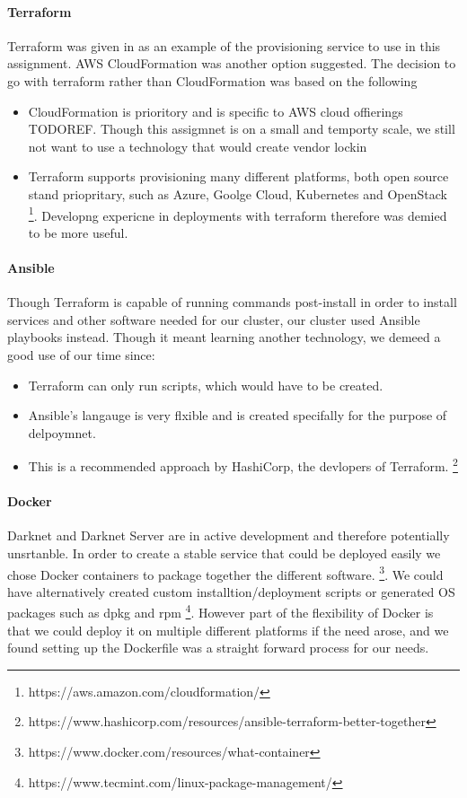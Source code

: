 \documentclass[conference]{IEEEtran}
\begin{document}
\paragraph{Terraform}
Terraform was given in as an example of the provisioning service to use in this assignment. AWS CloudFormation was another option suggested. The decision to go with terraform rather than CloudFormation was based on the following
\begin{itemize}
  \item CloudFormation is prioritory and is specific to AWS cloud offierings TODOREF. Though this assigmnet is on a small and temporty scale, we still not want to use a technology that would create vendor lockin
  \item Terraform supports provisioning many different platforms, both open source stand priopritary, such as Azure, Goolge Cloud, Kubernetes and OpenStack \footnote{https://aws.amazon.com/cloudformation/}. Developng expericne in deployments with terraform therefore was demied to be more useful.
\end{itemize}
\paragraph{Ansible}
Though Terraform is capable of running commands post-install in order to install services and other software needed for our cluster, our cluster used Ansible playbooks instead. Though it meant learning another technology, we demeed a good use of our time since:
\begin{itemize}
  \item Terraform can only run scripts, which would have to be created.
  \item Ansible's langauge is very flxible and is created specifally for the purpose of delpoymnet.
  \item This is a recommended approach by HashiCorp, the devlopers of Terraform. \footnote{https://www.hashicorp.com/resources/ansible-terraform-better-together}
\end{itemize}
\paragraph{Docker}
Darknet and Darknet Server are in active development and therefore potentially unsrtanble. In order to create a stable service that could be deployed easily we chose Docker containers to package together the different software. \footnote{https://www.docker.com/resources/what-container}. We could have alternatively created custom installtion/deployment scripts or generated OS packages such as dpkg and rpm \footnote{https://www.tecmint.com/linux-package-management/}. However part of the flexibility of Docker is that we could deploy it on multiple different platforms if the need arose, and we found setting up the Dockerfile was a straight forward process for our needs.
\end{document}
